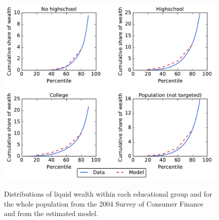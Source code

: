 \documentclass[11pt]{article}
\begin{document}
\begin{figure}[th]
	\begin{center}
	\includegraphics[width=.9\textwidth]{LorenzPoints.pdf}
	\label{fig:LorenzPts}
	\caption{Distributions of liquid wealth within each educational group and for the whole population from the 2004 Survey of Consumer Finance and from the estimated model.}
	\end{center}
\end{figure}

\let\bibfont=\small


\end{document}
